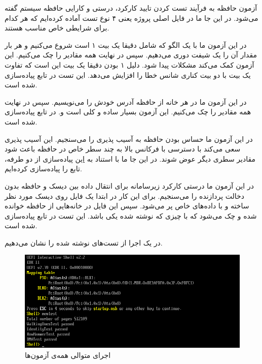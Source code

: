 




آزمون حافظه به فرآیند تست کردن تایید کارکرد، درستی و کارایی حافظه سیستم گفته می‌شود. در این جا ما در فایل اصلی پروژه یعنی  ۴ نوع تست آماده کرده‌ایم که هر کدام برای شرایطی خاص مناسب هستند.



در این آزمون ما با یک الگو که شامل دقیقا یک بیت ۱ است شروع می‌کنیم و هر بار مقدار آن را یک شیفت دوری می‌دهیم. سپس در نهایت همه مقادیر را چک می‌کنیم. این آزمون کمک می‌کند مشکلات  پیدا شود. دلیل ۱ بودن دقیقا یک بیت این است که تفاوت یک بیت با دو بیت کناری شانس خطا را افزایش می‌دهد. این تست در تابع  پیاده‌سازی شده است.


در این آزمون ما در هر خانه از حافظه آدرس خودش را می‌نویسیم. سپس در نهایت همه مقادیر را چک می‌کنیم. این آزمون بسیار ساده و کلی است و. در تابع  پیاده‌سازی شده است.


در این آزمون ما حساس بودن حافظه به آسیب پذیری  را می‌سنجیم. این آسیب پذیری سعی می‌کند با دسترسی با فرکانس بالا به چند سطر خاص در حافظه باعث شود مقادیر سطری دیگر عوض شوند. در این جا ما با استناد به \href{https://github.com/google/rowhammer-test/blob/master/double_sided_rowhammer.cc}{این} پیاده‌سازی از  دو طرفه، تابع  را پیاده‌سازی کرده‌ایم.


در این آزمون ما درستی کارکرد زیرسامانه  برای انتقال داده بین دیسک و حافظه بدون دخالت پردازنده را می‌سنجیم. برای این کار در ابتدا یک فایل روی دیسک مورد نظر ساخته و با داده‌های خاص پر می‌شود. سپس این فایل در خانه‌هایی از حافظه خوانده شده و چک می‌شود که با چیزی که نوشته شده یکی باشد. این تست در تابع  پیاده‌سازی شده است.


در  یک اجرا از تست‌های نوشته شده را نشان می‌دهیم.
\begin{figure}
	\centering
	\includegraphics[width=0.7\linewidth]{figs/test/test1}
	\caption{اجرای متوالی همه‌ی آزمون‌ها}
	\label{fig:test1}
\end{figure}



